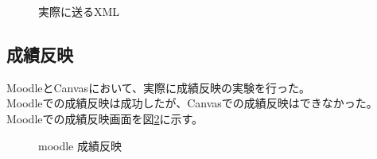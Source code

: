 \begin{figure}[htbp]
  \begin{center}
    \caption{実際に送るXML}
    \label{fig:XML}
  \end{center}
\end{figure}

\subsection{成績反映}
MoodleとCanvasにおいて、実際に成績反映の実験を行った。\\
Moodleでの成績反映は成功したが、Canvasでの成績反映はできなかった。
Moodleでの成績反映画面を図\ref{fig:moodle score}に示す。


\begin{figure}[htbp]
  \begin{center}
    \caption{moodle 成績反映}
    \label{fig:moodle score}
  \end{center}
\end{figure}
